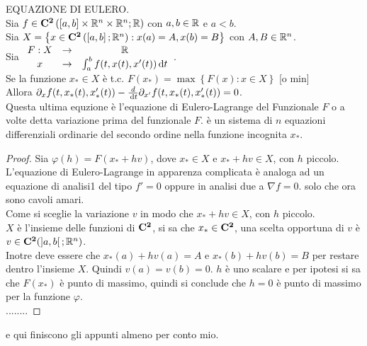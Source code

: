 \theorem EQUAZIONE DI EULERO.\\
Sia $f\in \mathbf{C^{2}}\left(\left[a,b\right]\times \mathbb{R} ^n\times \mathbb{R} ^n; \mathbb{R} \right)$ con $a,b\in \mathbb{R} $ e $a<b$.\\
Sia $X=\left\{x\in \mathbf{C^{2}}\left(\left[a,b\right]; \mathbb{R} ^n\right): x(a)=A, x(b)=B\right\}$ con $A,B\in \mathbb{R} ^n$.\\
Sia $\begin{array}{ccc} F: X & \to & \mathbb{R} \\
x & \to & \int_{a}^b f(t,x(t), x'(t))\,\mathrm{d}{t}\end{array}$.\\
Se la funzione $x_\ast\in X$ è t.c. $F(x_\ast)=\max\left\{F(x):x\in X \right\}$ [o min]\\
Allora $\partial_xf(t,x_\ast(t), x_\ast'(t))-\frac{d}{\,\mathrm{d}{t}}\partial_{ x'}f(t,x_\ast(t), x_\ast'(t))=0$.\\
Questa ultima equzione è l'equazione di Eulero-Lagrange del Funzionale $F$ o a volte detta variazione prima del funzionale $F$. è un sistema di $n$ equazioni differenziali ordinarie del secondo ordine nella funzione incognita $x_\ast$.
\begin{proof}
	 Sia $\varphi(h)=F(x_\ast+hv)$, dove $x_\ast\in X$ e $x_\ast+hv\in X$, con $h$ piccolo.\\
	 L'equazione di Eulero-Lagrange in apparenza complicata è analoga ad un equazione di analisi1 del tipo $f'=0$ oppure in analisi due a $\nabla f=0$. solo che ora sono cavoli amari.\\
	 Come si sceglie la variazione $v$ in modo che $x_\ast+hv\in X$, con $h$ piccolo.\\
	 $X$ è l'insieme delle funzioni di $\mathbf{C^{2}}$, si sa che $x_\ast\in \mathbf{C^{2}}$, una scelta opportuna di $v$ è $v\in \mathbf{C^{2}}(\left]a,b\right[; \mathbb{R} ^n)$.\\
	 Inotre deve essere che $ x_\ast(a)+hv(a)=A$ e  $x_\ast(b)+hv(b)=B$ per restare dentro l'insieme $X$.
	 Quindi $v(a)=v(b)=0$.
	 $h$ è uno scalare e per ipotesi si sa che $F(x_\ast)$ è punto di massimo, quindi si conclude che $h=0$ è punto di massimo per la funzione $\varphi$.\\
	 ........ 
\end{proof}
e qui finiscono gli appunti almeno per conto mio.


